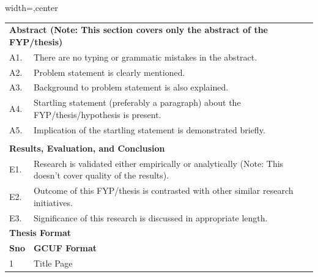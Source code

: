 \begin{table}[!ht]
\footnotesize
\begin{adjustbox}{width=\linewidth,center}
\begin{tabular}{p{0.6cm}p{9cm}p{0.6cm}}
\multicolumn{2}{l}{\textbf{Abstract (Note:   This section covers only the abstract of the FYP/thesis)}}                              &  \\
A1.            & There are no typing or grammatic   mistakes in the abstract.                                                    &  \\
A2.            & Problem statement is   clearly mentioned.                                                                       &  \\
A3.            & Background to problem   statement is also explained.                                                            &  \\
A4.            & Startling statement   (preferably a paragraph) about the FYP/thesis/hypothesis is present.                          &  \\
A5.            & Implication of the   startling statement is demonstrated briefly.                                               &  \\
               &                                                                                                                 &  \\
\multicolumn{2}{l}{\textbf{Results, Evaluation, and Conclusion}}                                                                 &  \\
E1.            & Research is   validated either empirically or analytically (Note: This doesn’t cover   quality of the results). &  \\
E2.            & Outcome of this   FYP/thesis is contrasted with other similar research initiatives.                                 &  \\
E3.            & Significance of this   research is discussed in appropriate length.                                             &  \\
\multicolumn{2}{l}{\textbf{Thesis Format}}                                                                                       &  \\
\textbf{Sno}   & \multicolumn{2}{l}{\textbf{GCUF  Format}}                                                                        \\
1              & Title Page                                                                                                      &  \\

\end{tabular}
\end{adjustbox}
\end{table}
